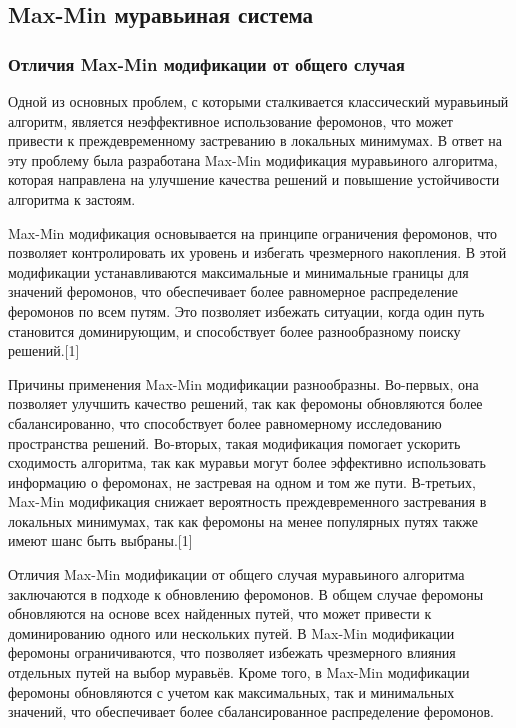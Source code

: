 \documentclass[14pt]{article}
\begin{document}
\subsection{Max-Min муравьиная система}

\subsubsection{Отличия Max-Min модификации от общего случая}

Одной из основных проблем, с которыми сталкивается классический муравьиный алгоритм, является неэффективное использование феромонов, что может привести к преждевременному застреванию в локальных минимумах. В ответ на эту проблему была разработана Max-Min модификация муравьиного алгоритма, которая направлена на улучшение качества решений и повышение устойчивости алгоритма к застоям.

Max-Min модификация основывается на принципе ограничения феромонов, что позволяет контролировать их уровень и избегать чрезмерного накопления. В этой модификации устанавливаются максимальные и минимальные границы для значений феромонов, что обеспечивает более равномерное распределение феромонов по всем путям. Это позволяет избежать ситуации, когда один путь становится доминирующим, и способствует более разнообразному поиску решений.[1]

Причины применения Max-Min модификации разнообразны. Во-первых, она позволяет улучшить качество решений, так как феромоны обновляются более сбалансированно, что способствует более равномерному исследованию пространства решений. Во-вторых, такая модификация помогает ускорить сходимость алгоритма, так как муравьи могут более эффективно использовать информацию о феромонах, не застревая на одном и том же пути. В-третьих, Max-Min модификация снижает вероятность преждевременного застревания в локальных минимумах, так как феромоны на менее популярных путях также имеют шанс быть выбраны.[1]

Отличия Max-Min модификации от общего случая муравьиного алгоритма заключаются в подходе к обновлению феромонов. В общем случае феромоны обновляются на основе всех найденных путей, что может привести к доминированию одного или нескольких путей. В Max-Min модификации феромоны ограничиваются, что позволяет избежать чрезмерного влияния отдельных путей на выбор муравьёв. Кроме того, в Max-Min модификации феромоны обновляются с учетом как максимальных, так и минимальных значений, что обеспечивает более сбалансированное распределение феромонов.
\end{document}
